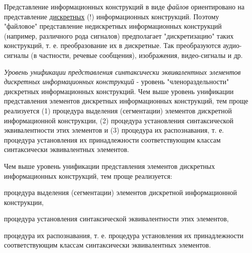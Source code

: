 Представление информационных конструкций в виде \textit{файлов} ориентировано на представление \underline{дискретных} (!) информационных конструкций.
Поэтому "файловое"{} представление недискретных информационных конструкций (например, различного рода сигналов) предполагает "дискретизацию"{} таких конструкций, т. е. преобразование их в дискретные.
Так преобразуются аудио-сигналы (в частности, речевые сообщения), изображения, видео-сигналы и др.

\begin{SCn}

    \begin{scnindent}
        \begin{scnindent}
        \end{scnindent}
        \begin{scnindent}
        \end{scnindent}
    \end{scnindent}

\end{SCn}

\textit{Уровень унификации представления синтаксически эквивалентных элементов дискретных информационных конструкций\scnsupergroupsign} - уровень "членораздельности"{} дискретных информационных конструкций.
Чем выше уровень унификации представления элементов дискретных информационных конструкций, тем проще реализуется (1) процедура выделения (сегментации) элементов дискретной информационной конструкции, (2) процедура установления синтаксической эквивалентности этих элементов и (3) процедура их распознавания, т. е. процедура установления их принадлежности соответствующим классам синтаксически эквивалентных элементов.

Чем выше уровень унификации представления элементов дискретных информационных конструкций, тем проще реализуется:
\begin{textitemize}
    \item процедура выделения (сегментации) элементов дискретной информационной конструкции,
    \item процедура установления синтаксической эквивалентности этих элементов,
    \item процедура их распознавания, т. е. процедура установления их принадлежности соответствующим классам синтаксически эквивалентных элементов.
\end{textitemize}

